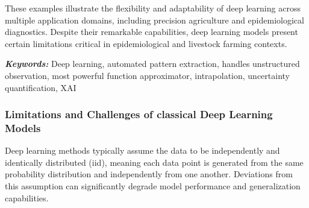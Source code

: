 These examples illustrate the flexibility and adaptability of deep learning across multiple application domains, including precision agriculture and epidemiological diagnostics. Despite their remarkable capabilities, deep learning models present certain limitations critical in epidemiological and livestock farming contexts. 

\textit{\textbf{Keywords:}} Deep learning, automated pattern extraction, handles unstructured observation, most powerful function approximator, intrapolation, uncertainty quantification, XAI


\subsubsection{Limitations and Challenges of classical Deep Learning Models}


Deep learning methods typically assume the data to be independently and identically distributed (iid), meaning each data point is generated from the same probability distribution and independently from one another. Deviations from this assumption can significantly degrade model performance and generalization capabilities.

